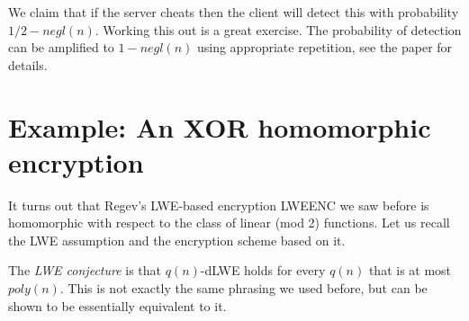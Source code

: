 We claim that if the server cheats then the client will detect this with
probability \(1/2 - negl(n)\). Working this out is a great exercise. The
probability of detection can be amplified to \(1-negl(n)\) using
appropriate repetition, see the paper for details.

\section{Example: An XOR homomorphic
encryption}\label{Example-An-XOR-homomorphi}

It turns out that Regev's LWE-based encryption LWEENC we saw before is
homomorphic with respect to the class of linear (mod 2) functions. Let
us recall the LWE assumption and the encryption scheme based on it.

\hypertarget{LWEdef}{}

The \emph{LWE conjecture} is that \(q(n)\)-dLWE holds for every \(q(n)\)
that is at most \(poly(n)\). This is not exactly the same phrasing we
used before, but can be shown to be essentially equivalent to it.


